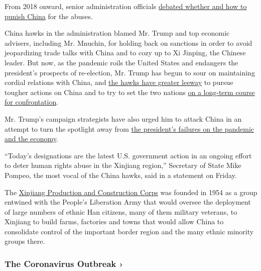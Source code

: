 From 2018 onward, senior administration officials
\href{https://www.nytimes.com/2018/09/10/world/asia/us-china-sanctions-muslim-camps.html}{debated
whether and how to punish China} for the abuses.

China hawks in the administration blamed Mr. Trump and top economic
advisers, including Mr. Mnuchin, for holding back on sanctions in order
to avoid jeopardizing trade talks with China and to cozy up to Xi
Jinping, the Chinese leader. But now, as the pandemic roils the United
States and endangers the president's prospects of re-election, Mr. Trump
has begun to sour on maintaining cordial relations with China, and
\href{https://www.nytimes.com/2020/07/25/world/asia/us-china-trump-xi.html}{the
hawks have greater leeway} to pursue tougher actions on China and to try
to set the two nations
\href{https://www.nytimes.com/2020/07/29/podcasts/the-daily/china-trump-foreign-policy.html}{on
a long-term course for confrontation}.

Mr. Trump's campaign strategists have also urged him to attack China in
an attempt to turn the spotlight away from
\href{https://www.nytimes.com/2020/07/18/us/politics/trump-coronavirus-response-failure-leadership.html}{the
president's failures on the pandemic and the economy}.

``Today's designations are the latest U.S. government action in an
ongoing effort to deter human rights abuse in the Xinjiang region,''
Secretary of State Mike Pompeo, the most vocal of the China hawks, said
in a statement on Friday.

The
\href{https://www.nytimes.com/2009/08/07/world/asia/07xinjiang.html}{Xinjiang
Production and Construction Corps} was founded in 1954 as a group
entwined with the People's Liberation Army that would oversee the
deployment of large numbers of ethnic Han citizens, many of them
military veterans, to Xinjiang to build farms, factories and towns that
would allow China to consolidate control of the important border region
and the many ethnic minority groups there.

\href{https://www.nytimes.com/news-event/coronavirus?action=click\&pgtype=Article\&state=default\&region=MAIN_CONTENT_3\&context=storylines_faq}{}

\hypertarget{the-coronavirus-outbreak-}{%
\subsubsection{The Coronavirus Outbreak
›}\label{the-coronavirus-outbreak-}}

